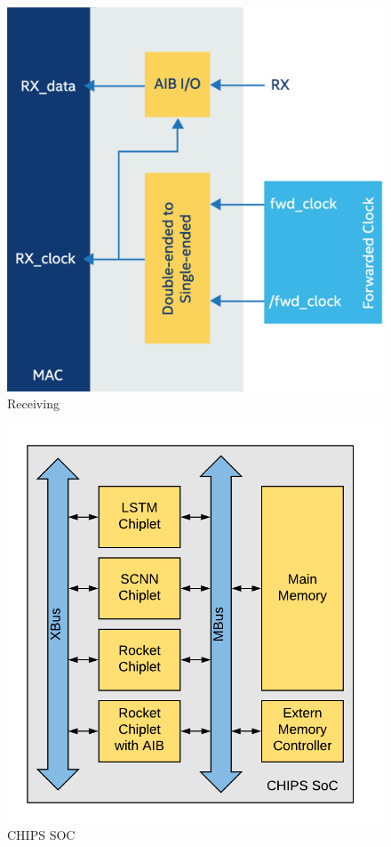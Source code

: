 \documentclass[../main.tex]{subfiles}
\begin{document}
\begin{figure}
    \centering
    \includegraphics[scale=.16]{pngs/AIB-Rx.png}
    \caption{Receiving\cite{AIBWhitePaper}}
    \label{fig:AIB-Rx}
\end{figure}

\begin{figure}
    \centering
    \includegraphics[scale=.45]{pngs/CHIPS-system.png}
    \caption{CHIPS SOC}
    \label{fig:CHIPS-arch}
\end{figure}
\end{document}

